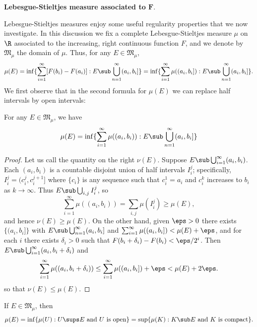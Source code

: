\textbf{Lebesgue-Stieltjes measure associated to $\bm{F}$}.\par
Lebesgue-Stieltjes measures enjoy some useful regularity properties that we now investigate. In this discussion we fix a complete Lebesgue-Stieltjes measure $\mu$ on $\R$ associated to the increasing, right continuous function $F$, and we denote by $\mathfrak{M}_{\mu}$ the domain of $\mu$. Thus, for any $E\in\mathfrak{M}_\mu$,
\[\mu(E)=\inf\{\sum_{i=1}^{\infty}[F(b_i)-F(a_i)]:E\sub\bigcup_{n=1}^{\infty}(a_i,b_i]\}=\inf\{\sum_{i=1}^{\infty}\mu((a_i,b_i]):E\sub\bigcup_{n=1}^{\infty}(a_i,b_i]\}.\]
We first observe that in the second formula for $\mu(E)$ we can replace half intervals by open intervals:
\begin{lemma}\label{measure Borel open interval cover}
For any $E\in\mathfrak{M}_\mu$, we have 
\[\mu(E)=\inf\{\sum_{i=1}^{\infty}\mu((a_i,b_i)):E\sub\bigcup_{n=1}^{\infty}(a_i,b_i]\}\]
\end{lemma}
\begin{proof}
Let us call the quantity on the right $\nu(E)$. Suppose $E\sub\bigcup_{i=1}^{\infty}(a_i,b_i)$. Each $(a_i,b_i)$ is a countable disjoint union of half intervals $I_i^j$; specifically, $I_i^j=(c_i^j,c_i^{j+1}]$ where $\{c_i\}$ is any sequence such that $c_i^1=a_i$ and $c_i^k$ increases to $b_i$ as $k\to\infty$. Thus $E\sub\bigcup_{i,j}I_i^j$, so
\[\sum_{i=1}^{\infty}\mu((a_i,b_i))=\sum_{i,j}\mu(I_i^j)\geq\mu(E),\]
and hence $\nu(E)\geq\mu(E)$. On the other hand, given $\eps>0$ there exists $\{(a_i,b_i]\}$ with $E\sub\bigcup_{n=1}^{\infty}(a_i,b_i]$ and $\sum_{i=1}^{\infty}\mu((a_i,b_i])<\mu(E)+\eps$, and for each $i$ there exists $\delta_i>0$ such that $F(b_i+\delta_i)-F(b_i)<\eps/2^i$. Then $E\sub\bigcup_{i=1}^{\infty}(a_i,b_i+\delta_i)$ and
\[\sum_{i=1}^{\infty}\mu((a_i,b_i+\delta_i))\leq\sum_{i=1}^{\infty}\mu((a_i,b_i])+\eps<\mu(E)+2\eps.\]
so that $\nu(E)\leq\mu(E)$.
\end{proof}
\begin{theorem}\label{Lebesgue-Stieltjes measure is regular}
If $E\in\mathfrak{M}_{\mu}$, then
\[\mu(E)=\inf\{\mu(U):U\sups E\text{ and $U$ is open}\}=\sup\{\mu(K):K\sub E\text{ and $K$ is compact}\}.\]
\end{theorem}
